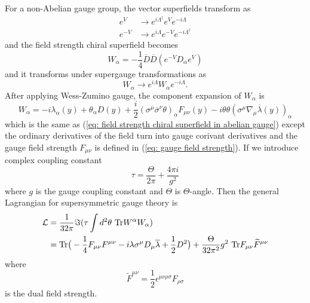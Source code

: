 \documentclass[12pt]{report}
\begin{document}
For a non-Abelian gauge group, the vector superfields transform as
\begin{align}
e^{V} &\to e^{i \Lambda^{\dag}} e^{V} e^{-i \Lambda}\\
e^{-V} & \to e^{i \Lambda} e^{-V} e^{-i \Lambda^{\dag}}
\end{align}
and the field strength chiral superfield becomes
\begin{equation}
W_{\alpha} = -\frac{1}{4} \overline{D} \overline{D} (e^{-V} D_{\alpha} e^{V})
\end{equation}
and it transforms under supergauge transformations as
\begin{equation}
W_{\alpha} \to e^{i \Lambda} W_{\alpha} e^{-i \Lambda}.
\end{equation}
After applying Wess-Zumino gauge, the component expansion of $W_{\alpha}$ is
\begin{equation}
W_{\alpha} = -i \lambda_{\alpha} (y) + \theta_{\alpha} D(y) + \frac{i}{2} (\sigma^{\mu} \overline{\sigma}^{\nu} \theta)_{\alpha} F_{\mu \nu} (y) - i \theta \theta (\sigma^{\mu} \nabla_{\mu} \overline{\lambda} (y))_{\alpha}
\end{equation}
which is the same as (\ref{eq: field strength chiral superfield in abelian gauge}) except the ordinary derivatives of the field turn into gauge corivant derivatives and the gauge field strength $F_{\mu \nu}$ is defined in (\ref{eq: gauge field strength}).
If we introduce complex coupling constant
\begin{equation}
\tau = \frac{\Theta}{2 \pi} + \frac{4 \pi i}{g^{2}}
\end{equation}
where $g$ is the gauge coupling constant and $\Theta$ is $\Theta$-angle.
Then the general Lagrangian for supersymmetric gauge theory is
\begin{align}
\mathcal{L} &= \frac{1}{32 \pi} \Im (\tau \int d^{2} \theta \ \mathrm{Tr} W^{\alpha} W_{\alpha}) \notag\\
&= \mathrm{Tr} \big( -\frac{1}{4} F_{\mu \nu} F^{\mu \nu} -i \lambda \sigma^{\mu} D_{\mu} \overline{\lambda} + \frac{1}{2} D^{2} \big)
+ \frac{\Theta}{32 \pi^{2}} g^{2} \ \mathrm{Tr} F_{\mu \nu} \widetilde{F}^{\mu \nu}
\end{align}
where
\begin{equation}
\widetilde{F}^{\mu \nu} = \frac{1}{2} \epsilon^{\mu \nu \rho \sigma} F_{\rho \sigma}
\end{equation}
is the dual field strength.
\end{document}
